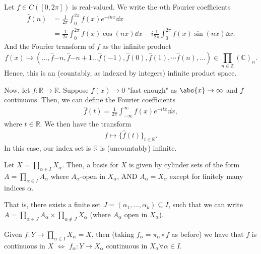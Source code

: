 \begin{example}
    Let $f \in C([0, 2\pi])$ is real-valued. We write the $n$th Fourier coefficients \begin{align*}
    \hat{f}(n) &= \frac{1}{2\pi}\int_0^{2\pi} f(x)e^{-in x}\dd{x}\\
    &=\frac{1}{2\pi}\int_{0}^{2\pi} f(x) \cos(n x) \dd{x} - i \frac{1}{2\pi} \int_{0}^{2\pi} f(x) \sin (n x) \dd{x}.
    \end{align*}
    And the Fourier transform of $f$ as the infinite product \[
    f(x) \mapsto (\dots, \hat{f}{-n}, \hat{f}{-n + 1} \dots \hat{f}(-1), \hat{f}(0), \hat{f}(1), \cdots \hat{f}(n), \dots) \in \prod_{n \in \mathbb{Z}}(\mathbb{C})_n.
    \]
    Hence, this is an (countably, as indexed by integers) infinite product space. 

    Now, let $f : \mathbb{R} \to \mathbb{R}$. Suppose $f(x) \to 0$ "fast enough" as $\abs{x} \to \infty$ and $f$ continuous. Then, we can define the Fourier coefficients \begin{align*}
        \hat{f}(t) = \frac{1}{2\pi} \int_{-\infty}^{\infty}f(x)e^{-itx} \dd{x},
    \end{align*}
    where $t \in \mathbb{R}$. We then have the transform \begin{align*}
        f \mapsto \{\hat{f}(t)\}_{t \in \mathbb{R}}.
    \end{align*}
    In this case, our index set is $\mathbb{R}$ is (uncountably) infinite.
\end{example}

\begin{definition}
    Let $X = \prod_{\alpha \in I} X_\alpha$. Then, a basis for $X$ is given by cylinder sets of the form $A = \prod_{\alpha \in I}A_\alpha$ where $A_\alpha$-open in $X_\alpha$, AND $A_\alpha = X_\alpha$ except for finitely many indices $\alpha$.

    That is, there exists a finite set $J = (\alpha_1, \dots, \alpha_k)\subseteq I$, such that we can write $A = \prod_{\alpha \in J}A_\alpha \times \prod_{\alpha \notin J}X_\alpha$ (where $A_\alpha$ open in $X_\alpha$).
\end{definition}

\begin{proposition}
    Given $f: Y \to \prod_{\alpha \in I}X_\alpha = X$, then (taking $f_\alpha = \pi_\alpha \circ f$ as before) we have that $f$ is continuous in $X$ $\iff$ $f_\alpha : Y \to X_\alpha$ continuous in $X_\alpha \forall \alpha \in I$.
\end{proposition}

